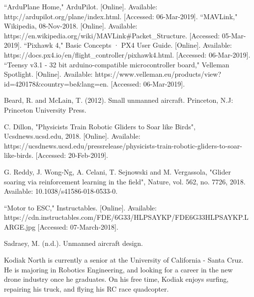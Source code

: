 \documentclass[12pt,journal,compsoc]{IEEEtran}
\begin{document}
\begin{thebibliography}{1}
``ArduPlane Home," ArduPilot. [Online]. Available: http://ardupilot.org/plane/index.html. [Accessed: 06-Mar-2019].
``MAVLink," Wikipedia, 08-Nov-2018. [Online]. Available: https://en.wikipedia.org/wiki/MAVLink\#Packet\_Structure. [Accessed: 05-Mar-2019].
``Pixhawk 4," Basic Concepts · PX4 User Guide. [Online]. Available: https://docs.px4.io/en/flight\_controller/pixhawk4.html. [Accessed: 06-Mar-2019].
``Teensy v3.1 - 32 bit arduino-compatible microcontroller board," Velleman Spotlight. [Online]. Available: https://www.velleman.eu/products/view?id=420178\&country=be\&lang=en. [Accessed: 06-Mar-2019].

Beard, R. and McLain, T. (2012). Small unmanned aircraft. Princeton, N.J: Princeton University Press.

C. Dillon, "Physicists Train Robotic Gliders to Soar like Birds", Ucsdnews.ucsd.edu, 2018. [Online]. Available: https://ucsdnews.ucsd.edu/pressrelease/physicists-train-robotic-gliders-to-soar-like-birds. [Accessed: 20-Feb-2019].

G. Reddy, J. Wong-Ng, A. Celani, T. Sejnowski and M. Vergassola, "Glider soaring via reinforcement learning in the field", Nature, vol. 562, no. 7726, 2018. Available: 10.1038/s41586-018-0533-0.

``Motor to ESC," Instructables. [Online]. Available: https://cdn.instructables.com/FDE/6G33/HLPSAYKP/FDE6G33HLPSAYKP.LARGE.jpg [Accessed: 07-March-2018].

Sadraey, M. (n.d.). Unmanned aircraft design.


\end{thebibliography}


\begin{IEEEbiographynophoto}{Kodiak North}
is currently a senior at the University of California - Santa Cruz. He is majoring in Robotics Engineering, and looking for a career in the new drone industry once he graduates. On his free time, Kodiak enjoys surfing, repairing his truck, and flying his RC race quadcopter.
\end{IEEEbiographynophoto}
\end{document}

